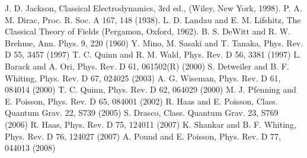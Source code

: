 \documentclass[prd,showpacs,preprint]{revtex4-1}
\begin{document}

\begin{thebibliography}{}
\label{sec:TeXbooks}
 J. D. Jackson, Classical Electrodynamics, 3rd ed., (Wiley, New York, 1998).
 P. A. M. Dirac, Proc. R. Soc. A 167, 148 (1938).
 L. D. Landau and E. M. Lifshitz, The Classical Theory of Fields (Pergamon, Oxford, 1962).
 B. S. DeWitt and R. W. Brehme, Ann. Phys. 9, 220 (1960)
 Y. Mino, M. Sasaki and T. Tanaka, Phys. Rev. D 55, 3457 (1997)
 T. C. Quinn and R. M. Wald, Phys. Rev. D 56, 3381 (1997)
 L. Barack and A. Ori, Phys. Rev. D 61, 061502(R) (2000)
 S. Detweiler and B. F. Whiting, Phys. Rev. D 67, 024025 (2003)
 A. G. Wiseman, Phys. Rev. D 61, 084014 (2000)
 T. C. Quinn, Phys. Rev. D 62, 064029 (2000)
 M. J. Pfenning and E. Poisson, Phys. Rev. D 65, 084001 (2002)
 R. Haas and E. Poisson, Class. Quantum Grav. 22, S739 (2005)
 S. Drasco, Class. Quantum Grav. 23, S769 (2006)
 R. Haas, Phys. Rev. D 75, 124011 (2007)
 K. Shankar and B. F. Whiting, Phys. Rev. D 76, 124027 (2007)
 A. Pound and E. Poisson, Phys. Rev. D 77, 044013 (2008)
\end{thebibliography}
\end{document}
